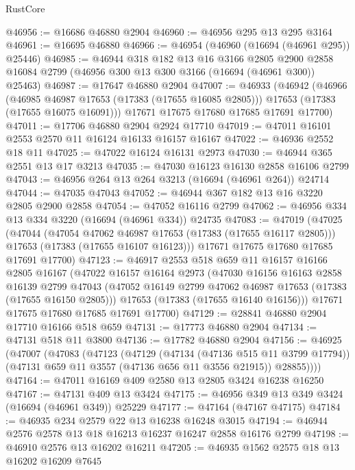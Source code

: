 \begin{lexlean}{RustCore}
\begin{coremodule}
@46956 := @16686 @46880 @2904
@46960 := @46956 @295 @13 @295 @3164
@46961 := @16695 @46880
@46966 := @46954 (@46960 (@16694 (@46961 @295)) @25446)
@46985 := @46944
    @318
    @182
    @13
    @16
    @3166
    @2805
    @2900
    @2858
    @16084
    @2799
    (@46956 @300 @13 @300 @3166 (@16694 (@46961 @300)) @25463)
@46987 := @17647 @46880 @2904
@47007 := @46933
    (@46942
      (@46966
        (@46985 @46987 @17653 (@17383 (@17655 @16085 @2805)))
        @17653
        (@17383 (@17655 @16075 @16091)))
      @17671
      @17675
      @17680
      @17685
      @17691
      @17700)
@47011 := @17706 @46880 @2904 @2924 @17710
@47019 := @47011 @16101 @2553 @2570 @11 @16124 @16133 @16157 @16167
@47022 := @46936 @2552 @18 @11
@47025 := @47022 @16124 @16131 @2973
@47030 := @46944 @365 @2551 @13 @17 @3213
@47035 := @47030 @16123 @16130 @2858 @16106 @2799
@47043 := @46956 @264 @13 @264 @3213 (@16694 (@46961 @264)) @24714
@47044 := @47035 @47043
@47052 := @46944 @367 @182 @13 @16 @3220 @2805 @2900 @2858
@47054 := @47052 @16116 @2799
@47062 := @46956 @334 @13 @334 @3220 (@16694 (@46961 @334)) @24735
@47083 := @47019
    (@47025
      (@47044
        (@47054 @47062 @46987 @17653 (@17383 (@17655 @16117 @2805)))
        @17653
        (@17383 (@17655 @16107 @16123)))
      @17671
      @17675
      @17680
      @17685
      @17691
      @17700)
@47123 := @46917
    @2553
    @518
    @659
    @11
    @16157
    @16166
    @2805
    @16167
    (@47022
      @16157
      @16164
      @2973
      (@47030
        @16156
        @16163
        @2858
        @16139
        @2799
        @47043
        (@47052 @16149 @2799 @47062 @46987 @17653 (@17383 (@17655 @16150 @2805)))
        @17653
        (@17383 (@17655 @16140 @16156)))
      @17671
      @17675
      @17680
      @17685
      @17691
      @17700)
@47129 := @28841 @46880 @2904 @17710 @16166 @518 @659
@47131 := @17773 @46880 @2904
@47134 := @47131 @518 @11 @3800
@47136 := @17782 @46880 @2904
@47156 := @46925
    (@47007
      (@47083
        (@47123
          (@47129
            (@47134 (@47136 @515 @11 @3799 @17794))
            (@47131 @659 @11 @3557 (@47136 @656 @11 @3556 @21915))
            @28855))))
@47164 := @47011 @16169 @409 @2580 @13 @2805 @3424 @16238 @16250
@47167 := @47131 @409 @13 @3424
@47175 := @46956 @349 @13 @349 @3424 (@16694 (@46961 @349)) @25229
@47177 := @47164 (@47167 @47175)
@47184 := @46935 @234 @2579 @22 @13 @16238 @16248 @3015
@47194 := @46944 @2576 @2578 @13 @18 @16213 @16237 @16247 @2858 @16176 @2799
@47198 := @46910 @2576 @13 @16202 @16211
@47205 := @46935 @1562 @2575 @18 @13 @16202 @16209 @7645

\end{coremodule}
\end{lexlean}
